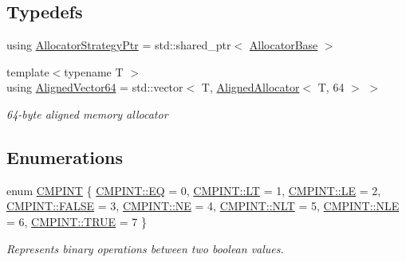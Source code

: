 \subsection*{Typedefs}
\begin{DoxyCompactItemize}
\item 
using \hyperlink{namespaceintel_1_1hexl_aced64250965d3b78827d8009634eef0c}{Allocator\+Strategy\+Ptr} = std\+::shared\+\_\+ptr$<$ \hyperlink{structintel_1_1hexl_1_1AllocatorBase}{Allocator\+Base} $>$
\item 
{\footnotesize template$<$typename T $>$ }\\using \hyperlink{namespaceintel_1_1hexl_afbdf0d2cc4209ee547a88ff22a02801b}{Aligned\+Vector64} = std\+::vector$<$ T, \hyperlink{classintel_1_1hexl_1_1AlignedAllocator}{Aligned\+Allocator}$<$ T, 64 $>$ $>$
\begin{DoxyCompactList}\small\item\em 64-\/byte aligned memory allocator \end{DoxyCompactList}\end{DoxyCompactItemize}
\subsection*{Enumerations}
\begin{DoxyCompactItemize}
\item 
enum \hyperlink{namespaceintel_1_1hexl_abdcc9d2d5bb10fa95d5f143874508006}{C\+M\+P\+I\+NT} \{ \newline
\hyperlink{namespaceintel_1_1hexl_abdcc9d2d5bb10fa95d5f143874508006a2dcbad7477fd40561e8b8198f173bd47}{C\+M\+P\+I\+N\+T\+::\+EQ} = 0, 
\hyperlink{namespaceintel_1_1hexl_abdcc9d2d5bb10fa95d5f143874508006ac562607189d77eb9dfb707464c1e7b0b}{C\+M\+P\+I\+N\+T\+::\+LT} = 1, 
\hyperlink{namespaceintel_1_1hexl_abdcc9d2d5bb10fa95d5f143874508006acfe6055d2e0503be378bb63449ec7ba6}{C\+M\+P\+I\+N\+T\+::\+LE} = 2, 
\hyperlink{namespaceintel_1_1hexl_abdcc9d2d5bb10fa95d5f143874508006a946003f97ccc52d5d3b54ac0ec31bbfc}{C\+M\+P\+I\+N\+T\+::\+F\+A\+L\+SE} = 3, 
\newline
\hyperlink{namespaceintel_1_1hexl_abdcc9d2d5bb10fa95d5f143874508006adc33066c3993e0d50896e533fd692ce0}{C\+M\+P\+I\+N\+T\+::\+NE} = 4, 
\hyperlink{namespaceintel_1_1hexl_abdcc9d2d5bb10fa95d5f143874508006ad7d6a13c7b311ec8a3c9fcfb1919a2f8}{C\+M\+P\+I\+N\+T\+::\+N\+LT} = 5, 
\hyperlink{namespaceintel_1_1hexl_abdcc9d2d5bb10fa95d5f143874508006aacd748f300c5d189c47807e2a9d6ea57}{C\+M\+P\+I\+N\+T\+::\+N\+LE} = 6, 
\hyperlink{namespaceintel_1_1hexl_abdcc9d2d5bb10fa95d5f143874508006ac0d83f0b82a6b30de8811e69e6d95c61}{C\+M\+P\+I\+N\+T\+::\+T\+R\+UE} = 7
 \}\begin{DoxyCompactList}\small\item\em Represents binary operations between two boolean values. \end{DoxyCompactList}
\end{DoxyCompactItemize}
